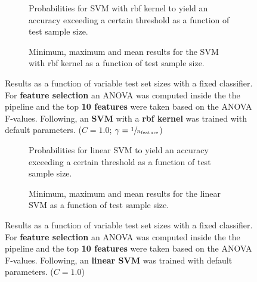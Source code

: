 \begin{figure}
    \captionsetup[subfigure]{justification=justified,singlelinecheck=false}
    \begin{subfigure}[t]{0.61\textwidth}
        
        \caption{Probabilities for SVM with rbf kernel to yield an accuracy exceeding a certain threshold as a function of test sample size.}
    \end{subfigure}
    \hspace{3.0mm}
    \begin{subfigure}[t]{0.34\textwidth}
        
        \caption{Minimum, maximum and mean results for the SVM with rbf kernel as a function of test sample size.}
    \end{subfigure}
    \caption[Effects of varying test sample size. SVM (kernel = rbf); Preprocessing: ANOVA feature selection ($k_\text{best} = \num{10}$)]{Results as a function of variable test set sizes with a fixed classifier. For \textbf{feature selection} an ANOVA was computed inside the the pipeline and the top \textbf{\num{10} features} were taken based on the ANOVA F-values. Following, an \textbf{{SVM}} with a \textbf{{rbf kernel}} was trained with default parameters. ($C=\num{1.0}$; $\gamma=\sfrac{1}{n_\text{feature}}$)}
    \label{fig:no_PCA_10_best_selected_SVC}
\end{figure}

\begin{figure}
    \captionsetup[subfigure]{justification=justified,singlelinecheck=false}
    \begin{subfigure}[t]{0.61\textwidth}
        
        \caption{Probabilities for linear SVM to yield an accuracy exceeding a certain threshold as a function of test sample size.}
    \end{subfigure}
    \hspace{3.0mm}
    \begin{subfigure}[t]{0.34\textwidth}
        
        \caption{Minimum, maximum and mean results for the linear SVM as a function of test sample size.}
    \end{subfigure}
    \caption[Effects of varying test sample size. Linear SVM; Preprocessing: ANOVA feature selection ($k_\text{best} = \num{10}$)]{Results as a function of variable test set sizes with a fixed classifier. For \textbf{feature selection} an ANOVA was computed inside the the pipeline and the top \textbf{\num{10} features} were taken based on the ANOVA F-values. Following, an \textbf{{linear SVM}} was trained with default parameters. ($C=\num{1.0}$)}
    \label{fig:no_PCA_10_best_selected_LinearSVC}
\end{figure}

